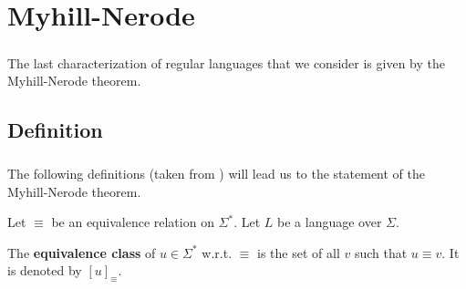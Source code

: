 
\chapter{Myhill-Nerode}
\label{chap:MN}

\paragraph{}

The last characterization of regular languages that we consider is given by the Myhill-Nerode theorem.

\section{Definition}

\paragraph{}

The following definitions (taken from \cite{DBLP:books/daglib/0088160}) will lead us to the statement of the Myhill-Nerode theorem.

    Let $\equiv$ be an equivalence relation on $\Sigma^*$. Let $L$ be a language over $\Sigma$.

\begin{definition}
    The \textbf{equivalence class} of $u \in \Sigma^*$ w.r.t. $\equiv$ is the set of all $v$ such that $u \equiv v$.
    It is denoted by $[u]_\equiv$.

\end{definition}
    
